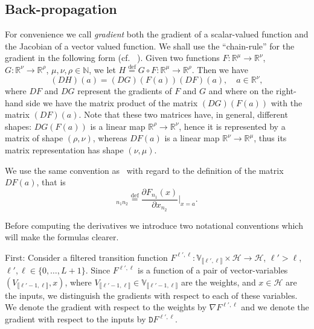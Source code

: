 \documentclass[10pt, a4paper]{article}
\theoremstyle{plain}
\theoremstyle{definition}
\theoremstyle{definition}
\theoremstyle{definition}
\theoremstyle{definition}
\theoremstyle{definition}
\theoremstyle{definition}
\theoremstyle{definition}
\theoremstyle{remark}
\theoremstyle{remark}
\theoremstyle{rudin-style-generic}
\theoremstyle{rudin-style-generic*}
\theoremstyle{rudin-style-theorem}
\newcommand{\deq}{\stackrel{\mathrm{def}}{=}}
\newcommand{\NN}{\mathbb N}
\newcommand{\RR}{\mathbb R}
\begin{document}
  \subsection{Back-propagation}
  For convenience we call \textit{gradient} both the gradient of a scalar-valued function and the Jacobian of a vector valued function.
  We shall use the ``chain-rule'' for the gradient in the following form
  (cf.~ \cite[formula (1.4) p. 23, and Theorem (2.3) p. 27]{boothbyIntroductionDifferentiableManifolds2003}).
  Given two functions $F:\RR^\mu\rightarrow\RR^\nu$, $G:\RR^\nu\rightarrow \RR^\rho $, $\mu,\nu,\rho\in\NN$, we let
  $H\deq G\circ F:\RR^\mu\rightarrow\RR^\rho$.
  Then we have
  \begin{equation}
    \label{eq:9}
    (DH)( a ) = (DG)( F(a) ) (DF)(a), \quad a\in\RR^\nu
    ,
  \end{equation}
  where $DF$ and $DG$ represent the gradients of $F$ and $G$ 
  and  where on the right-hand side we have the matrix product of the matrix $(DG)( F(a) )$ with the matrix $(DF)(a)$.
  Note that these two matrices have, in general, different shapes:
  $DG( F(a) )$ is a linear map $\RR^{\rho}\rightarrow\RR^{\nu}$, hence it is represented by a matrix of shape $(\rho,\nu)$, 
  whereas $DF(a)$ is a linear map $\RR^{\nu}\rightarrow\RR^{\mu}$, thus its matrix representation has shape $(\nu,\mu)$.
  
  We use the same convention as~\cite{boothbyIntroductionDifferentiableManifolds2003} with regard to the definition
  of the matrix $DF(a)$, that is
  \begin{equation*}
    [DF(a)]_{n_1 n_2} \deq \frac{\partial F_{n_1} (x)}{\partial x_{n_2}}\Big|_{x=a}
    .
  \end{equation*}

  
  Before computing the derivatives we introduce two notational conventions which will make the formulas clearer.

  First: Consider a filtered transition function $F^{\ell',\ell}:\mathbb V_{\llbracket \ell' , \ell \rrbracket} \times\mathcal H\rightarrow \mathcal H$,
  $\ell'>\ell$, $\ell',\ell\in\{0,\dots,L+1\}$.
  Since $F^{\ell',\ell}$ is a function of a pair of vector-variables $(V_{\llbracket \ell' -1, \ell \rrbracket},x)$,
  where
  $V_{\llbracket \ell'-1 , \ell \rrbracket}\in\mathbb V_{\llbracket \ell'-1 , \ell \rrbracket}$ are the weights, and
  $x\in\mathcal H$ are the inputs,
  we distinguish the gradients with respect to each of these variables.
  We denote the gradient with respect to the weights by $\nabla F^{\ell',\ell}$
  and we denote the gradient with respect  to the inputs by $\mathtt D F^{\ell',\ell}$.
\end{document}
